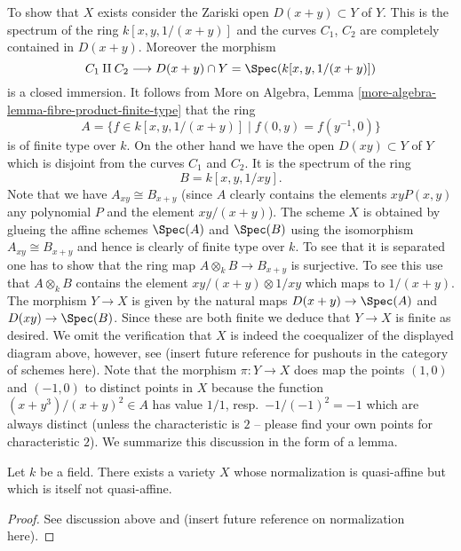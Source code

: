 \medskip\noindent
To show that $X$ exists consider the Zariski open
$D(x + y) \subset Y$ of $Y$. This is the spectrum
of the ring
$k[x, y, 1/(x + y)]$
and the curves $C_1$, $C_2$ are completely contained in
$D(x + y)$. Moreover the morphism
$$
C_1 \amalg C_2
\longrightarrow
D(x + y) \cap Y = \Spec(k[x, y, 1/(x + y)])
$$
is a closed immersion. It follows from
More on Algebra, Lemma \ref{more-algebra-lemma-fibre-product-finite-type}
that the ring
$$
A =
\{f \in k[x, y, 1/(x + y)] \mid f(0, y) = f(y^{-1}, 0)\}
$$
is of finite type over $k$. On the other hand we have the open
$D(xy) \subset Y$ of $Y$ which is disjoint from the curves $C_1$
and $C_2$. It is the spectrum of the ring
$$
B = k[x, y, 1/xy].
$$
Note that we have $A_{xy} \cong B_{x + y}$ (since $A$ clearly contains
the elements $xyP(x, y)$ any polynomial $P$ and the element $xy/(x + y)$).
The scheme $X$ is obtained by glueing the affine schemes
$\Spec(A)$ and $\Spec(B)$ using the isomorphism
$A_{xy} \cong B_{x + y}$ and hence is clearly of finite type over
$k$. To see that it is separated one has to show that the
ring map $A \otimes_k B \to B_{x + y}$ is surjective. To see
this use that $A \otimes_k B$ contains the element
$xy/(x + y) \otimes 1/xy$ which maps to $1/(x + y)$.
The morphism $Y \to X$ is given by the natural maps
$D(x + y) \to \Spec(A)$ and $D(xy) \to \Spec(B)$.
Since these are both finite we deduce that $Y \to X$ is finite
as desired. We omit the verification that $X$ is indeed the
coequalizer of the displayed diagram above, however, see
(insert future reference for pushouts in the category of schemes
here). Note that the morphism $\pi : Y \to X$ does
map the points  $(1, 0)$
and $(-1, 0)$ to distinct points in $X$ because the
function $(x + y^3)/(x + y)^2 \in A$ has value
$1/1$, resp.\ $-1/(-1)^2 = -1$ which are always distinct
(unless the characteristic is $2$ -- please find your own points
for characteristic $2$). We summarize this discussion in the
form of a lemma.

\begin{lemma}
\label{lemma-quasi-affine-normalization-not-quasi-affine}
Let $k$ be a field.
There exists a variety $X$ whose normalization is quasi-affine but
which is itself not quasi-affine.
\end{lemma}

\begin{proof}
See discussion above and (insert future reference on normalization here).
\end{proof}






